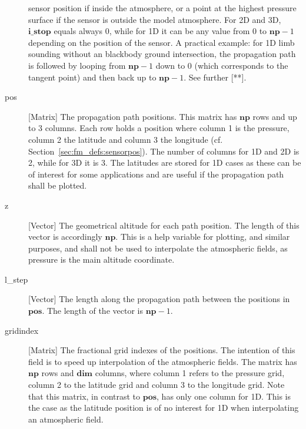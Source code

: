 \begin{description}
     sensor position if inside the atmosphere, or a point at the highest
     pressure surface if the sensor is outside the model atmosphere. 
     For 2D and 3D, $\mathbf{i\_stop}$ equals always 0, while for 1D it 
     can be any value from 0 to $\mathbf{np}-1$ depending on the position 
     of the sensor. A practical example: for 1D limb sounding without an
     blackbody ground intersection, the propagation path is followed by
     looping from $\mathbf{np}-1$ down to 0 (which corresponds to the tangent
     point) and then back up to $\mathbf{np}-1$. See further [**].
  \item[pos] [Matrix] The propagation path positions. This matrix has 
     $\mathbf{np}$ rows and up to 3 columns. Each row holds a position
     where column 1 is the pressure, column 2 the latitude and column 3 the
     longitude (cf. Section~\ref{sec:fm_defs:sensorpos}). The number of 
     columns for 1D and 2D is 2, while for 3D it is 3. The latitudes are 
     stored for 1D cases as these can be of interest for some applications 
     and are useful if the propagation path shall be plotted.
  \item[z] [Vector] The geometrical altitude for each path position. The
     length of this vector is accordingly $\mathbf{np}$. This is a help
     variable for plotting, and similar purposes, and shall not be used to
     interpolate the atmospheric fields, as pressure is the main altitude
     coordinate.
  \item[l\_step] [Vector] The length along the propagation path between
     the positions in $\mathbf{pos}$. The length of the vector is
     $\mathbf{np}-1$. 
  \item[gridindex] [Matrix] The fractional grid indexes of the positions.
     The intention of this field is to speed up interpolation of the 
     atmospheric fields. The matrix has $\mathbf{np}$ rows and $\mathbf{dim}$ 
     columns, where column 1 refers to the pressure grid, column 2 to the 
     latitude grid and column 3 to the longitude grid. Note that this matrix,
     in contrast to $\mathbf{pos}$, has only one column for 1D. This is the 
     case as the latitude position is of no interest for 1D when interpolating
     an atmospheric field. 


\end{description}
